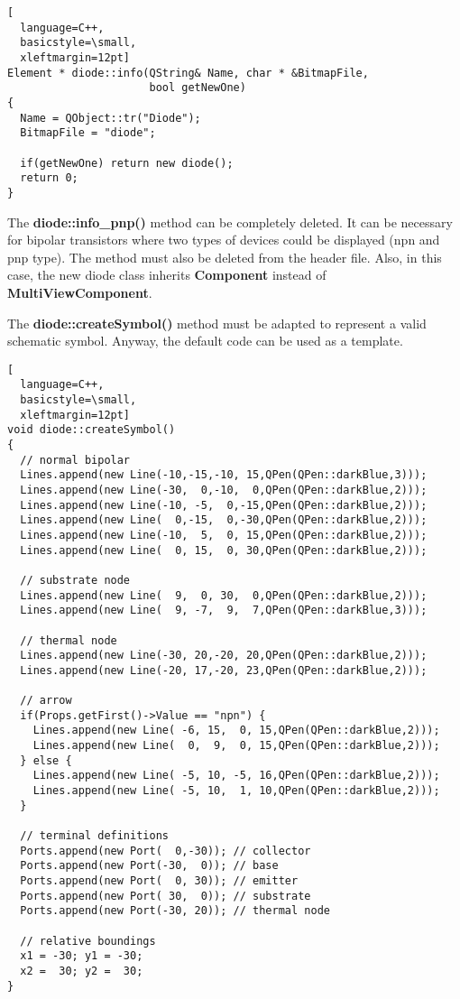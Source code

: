\begin{lstlisting}[
  language=C++,
  basicstyle=\small,
  xleftmargin=12pt]
Element * diode::info(QString& Name, char * &BitmapFile,
                      bool getNewOne)
{
  Name = QObject::tr("Diode");
  BitmapFile = "diode";

  if(getNewOne) return new diode();
  return 0;
}
\end{lstlisting}

The \textbf{diode::info\_pnp()} method can be completely deleted.  It
can be necessary for bipolar transistors where two types of devices
could be displayed (npn and pnp type).  The method must also be
deleted from the header file.  Also, in this case, the new diode class
inherits \textbf{Component} instead of \textbf{MultiViewComponent}.

\addvspace{12pt}

The \textbf{diode::createSymbol()} method must be adapted to represent
a valid schematic symbol.  Anyway, the default code can be used as a
template.
\begin{lstlisting}[
  language=C++,
  basicstyle=\small,
  xleftmargin=12pt]
void diode::createSymbol()
{
  // normal bipolar
  Lines.append(new Line(-10,-15,-10, 15,QPen(QPen::darkBlue,3)));
  Lines.append(new Line(-30,  0,-10,  0,QPen(QPen::darkBlue,2)));
  Lines.append(new Line(-10, -5,  0,-15,QPen(QPen::darkBlue,2)));
  Lines.append(new Line(  0,-15,  0,-30,QPen(QPen::darkBlue,2)));
  Lines.append(new Line(-10,  5,  0, 15,QPen(QPen::darkBlue,2)));
  Lines.append(new Line(  0, 15,  0, 30,QPen(QPen::darkBlue,2)));

  // substrate node
  Lines.append(new Line(  9,  0, 30,  0,QPen(QPen::darkBlue,2)));
  Lines.append(new Line(  9, -7,  9,  7,QPen(QPen::darkBlue,3)));

  // thermal node
  Lines.append(new Line(-30, 20,-20, 20,QPen(QPen::darkBlue,2)));
  Lines.append(new Line(-20, 17,-20, 23,QPen(QPen::darkBlue,2)));  

  // arrow
  if(Props.getFirst()->Value == "npn") {
    Lines.append(new Line( -6, 15,  0, 15,QPen(QPen::darkBlue,2)));
    Lines.append(new Line(  0,  9,  0, 15,QPen(QPen::darkBlue,2)));
  } else {
    Lines.append(new Line( -5, 10, -5, 16,QPen(QPen::darkBlue,2)));
    Lines.append(new Line( -5, 10,  1, 10,QPen(QPen::darkBlue,2)));
  }

  // terminal definitions
  Ports.append(new Port(  0,-30)); // collector
  Ports.append(new Port(-30,  0)); // base
  Ports.append(new Port(  0, 30)); // emitter
  Ports.append(new Port( 30,  0)); // substrate
  Ports.append(new Port(-30, 20)); // thermal node

  // relative boundings
  x1 = -30; y1 = -30;
  x2 =  30; y2 =  30;
}
\end{lstlisting}

